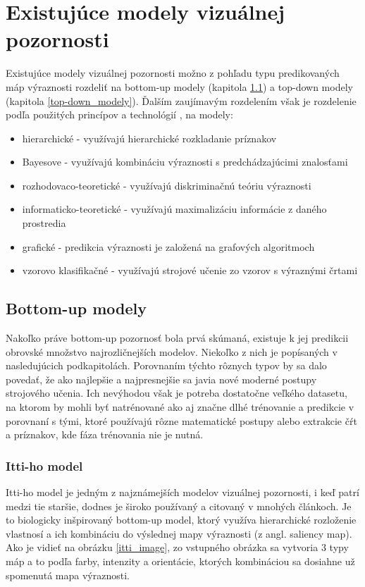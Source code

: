 \section{Existujúce modely vizuálnej pozornosti}

Existujúce modely vizuálnej pozornosti možno z pohľadu typu predikovaných máp výraznosti rozdeliť na bottom-up modely (kapitola \ref{bottom-up_modely}) a top-down modely (kapitola \ref{top-down_modely}). Ďalším zaujímavým rozdelením však je rozdelenie podľa použitých princípov a technológií \cite{polatsek}, na modely:

\begin{itemize}
	\item hierarchické - využívajú hierarchické rozkladanie príznakov
	\item Bayesove - využívajú kombináciu výraznosti s predchádzajúcimi znalosťami
	\item rozhodovaco-teoretické - využívajú diskriminačnú teóriu výraznosti
	\item informaticko-teoretické - využívajú maximalizáciu informácie z daného prostredia
	\item grafické - predikcia výraznosti je založená na grafových algoritmoch
	\item vzorovo klasifikačné - využívajú strojové učenie zo vzorov s výraznými črtami
\end{itemize}

\subsection{Bottom-up modely}
\label{bottom-up_modely}
Nakoľko práve bottom-up pozornosť bola prvá skúmaná, existuje k jej predikcii obrovské množstvo najrozličnejších modelov. Niekoľko z nich je popísaných v nasledujúcich podkapitolách. Porovnaním týchto rôznych typov by sa dalo povedať, že ako najlepšie a najpresnejšie sa javia nové moderné postupy strojového učenia. Ich nevýhodou však je potreba dostatočne veľkého datasetu, na ktorom by mohli byť natrénované ako aj značne dlhé trénovanie a predikcie v porovnaní s tými, ktoré používajú rôzne matematické postupy alebo extrakcie čŕt a príznakov, kde fáza trénovania nie je nutná.

\subsubsection{Itti-ho model}

Itti-ho model\cite{itti} je jedným z najznámejších modelov vizuálnej pozornosti, i keď patrí medzi tie staršie, dodnes je široko používaný a citovaný v mnohých článkoch. Je to biologicky inšpirovaný bottom-up model, ktorý využíva hierarchické rozloženie vlastnosí a ich kombináciu do výslednej mapy výraznosti (z angl. saliency map). Ako je vidieť na obrázku \ref{itti_image}, zo vstupného obrázka sa vytvoria 3 typy máp a to podľa farby, intenzity a orientácie, ktorých kombináciou sa dosiahne už spomenutá mapa výraznosti. 

